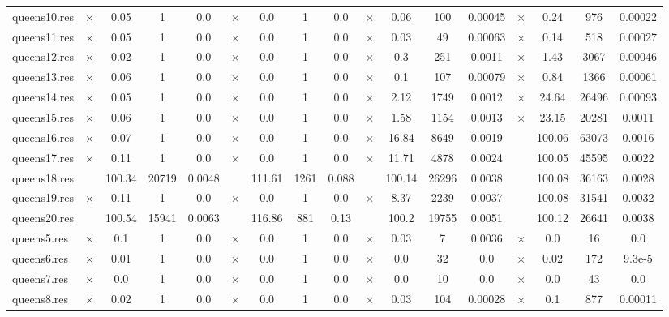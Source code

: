 \documentclass[main.tex]{subfiles}
\begin{document}
\begin{landscape}
\begin{center}
\begin{tabular}{|l|cccc|cccc|cccc|cccc|}
queens10.res & $\times$ & 0.05 & 1 & 0.0
 & $\times$ & 0.0 & 1 & 0.0
 & $\times$ & 0.06 & 100 & 0.00045
 & $\times$ & 0.24 & 976 & 0.00022
\\
queens11.res & $\times$ & 0.05 & 1 & 0.0
 & $\times$ & 0.0 & 1 & 0.0
 & $\times$ & 0.03 & 49 & 0.00063
 & $\times$ & 0.14 & 518 & 0.00027
\\
queens12.res & $\times$ & 0.02 & 1 & 0.0
 & $\times$ & 0.0 & 1 & 0.0
 & $\times$ & 0.3 & 251 & 0.0011
 & $\times$ & 1.43 & 3067 & 0.00046
\\
queens13.res & $\times$ & 0.06 & 1 & 0.0
 & $\times$ & 0.0 & 1 & 0.0
 & $\times$ & 0.1 & 107 & 0.00079
 & $\times$ & 0.84 & 1366 & 0.00061
\\
queens14.res & $\times$ & 0.05 & 1 & 0.0
 & $\times$ & 0.0 & 1 & 0.0
 & $\times$ & 2.12 & 1749 & 0.0012
 & $\times$ & 24.64 & 26496 & 0.00093
\\
queens15.res & $\times$ & 0.06 & 1 & 0.0
 & $\times$ & 0.0 & 1 & 0.0
 & $\times$ & 1.58 & 1154 & 0.0013
 & $\times$ & 23.15 & 20281 & 0.0011
\\
queens16.res & $\times$ & 0.07 & 1 & 0.0
 & $\times$ & 0.0 & 1 & 0.0
 & $\times$ & 16.84 & 8649 & 0.0019
 &  & 100.06 & 63073 & 0.0016
\\
queens17.res & $\times$ & 0.11 & 1 & 0.0
 & $\times$ & 0.0 & 1 & 0.0
 & $\times$ & 11.71 & 4878 & 0.0024
 &  & 100.05 & 45595 & 0.0022
\\
queens18.res &  & 100.34 & 20719 & 0.0048
 &  & 111.61 & 1261 & 0.088
 &  & 100.14 & 26296 & 0.0038
 &  & 100.08 & 36163 & 0.0028
\\
queens19.res & $\times$ & 0.11 & 1 & 0.0
 & $\times$ & 0.0 & 1 & 0.0
 & $\times$ & 8.37 & 2239 & 0.0037
 &  & 100.08 & 31541 & 0.0032
\\
queens20.res &  & 100.54 & 15941 & 0.0063
 &  & 116.86 & 881 & 0.13
 &  & 100.2 & 19755 & 0.0051
 &  & 100.12 & 26641 & 0.0038
\\
queens5.res & $\times$ & 0.1 & 1 & 0.0
 & $\times$ & 0.0 & 1 & 0.0
 & $\times$ & 0.03 & 7 & 0.0036
 & $\times$ & 0.0 & 16 & 0.0
\\
queens6.res & $\times$ & 0.01 & 1 & 0.0
 & $\times$ & 0.0 & 1 & 0.0
 & $\times$ & 0.0 & 32 & 0.0
 & $\times$ & 0.02 & 172 & 9.3e-5
\\
queens7.res & $\times$ & 0.0 & 1 & 0.0
 & $\times$ & 0.0 & 1 & 0.0
 & $\times$ & 0.0 & 10 & 0.0
 & $\times$ & 0.0 & 43 & 0.0
\\
queens8.res & $\times$ & 0.02 & 1 & 0.0
 & $\times$ & 0.0 & 1 & 0.0
 & $\times$ & 0.03 & 104 & 0.00028
 & $\times$ & 0.1 & 877 & 0.00011

\end{tabular}
\end{center}
\end{landscape}
\end{document}
